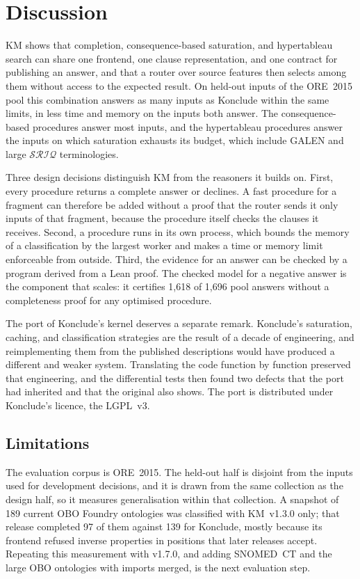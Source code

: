 \section{Discussion}
\label{sec:discussion}

KM shows that completion, consequence-based saturation, and hypertableau search
can share one frontend, one clause representation, and one contract for
publishing an answer, and that a router over source features then selects among
them without access to the expected result.  On held-out inputs of the
ORE~2015 pool this combination answers as many inputs as Konclude within the
same limits, in less time and memory on the inputs both answer.  The
consequence-based procedures answer most inputs, and the hypertableau
procedures answer the inputs on which saturation exhausts its budget, which
include GALEN and large $\mathcal{SRIQ}$ terminologies.  

Three design decisions distinguish KM from the reasoners it builds on.  First,
every procedure returns a complete answer or declines.  A fast procedure for a
fragment can therefore be added without a proof that the router sends it only
inputs of that fragment, because the procedure itself checks the clauses it
receives.  Second, a procedure runs in its own process, which bounds the memory
of a classification by the largest worker and makes a time or memory limit
enforceable from outside.  Third, the evidence for an answer can be checked
by a program derived from a Lean proof.  The checked model for a negative
answer is the component that scales: it certifies 1,618 of 1,696 pool answers
without a completeness proof for any optimised procedure.

The port of Konclude's kernel deserves a separate remark.  Konclude's
saturation, caching, and classification strategies are the result of a decade
of engineering, and reimplementing them from the published descriptions would
have produced a different and weaker system.  Translating the code function by
function preserved that engineering, and the differential tests then found two
defects that the port had inherited and that the original also shows.  The
port is distributed under Konclude's licence, the LGPL~v3.

\subsection{Limitations}
\label{sec:limitations}

The evaluation corpus is ORE~2015.  The held-out half is disjoint from the
inputs used for development decisions, and it is drawn from the same
collection as the design half, so it measures generalisation within that
collection.  A snapshot of 189 current OBO Foundry ontologies was classified
with KM~v1.3.0 only; that release completed 97 of them against 139 for
Konclude, mostly because its frontend refused inverse properties in positions
that later releases accept.  Repeating this measurement with v1.7.0, and
adding SNOMED~CT and the large OBO ontologies with imports merged, is the next
evaluation step.

